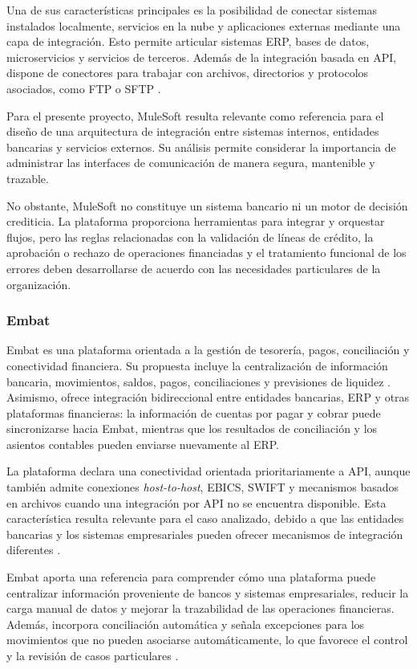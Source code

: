 Una de sus características principales es la posibilidad de conectar sistemas instalados localmente, servicios en la nube y aplicaciones externas mediante una capa de integración. Esto permite articular sistemas ERP, bases de datos, microservicios y servicios de terceros. Además de la integración basada en API, dispone de conectores para trabajar con archivos, directorios y protocolos asociados, como FTP o SFTP \citep{mulesoft}.

Para el presente proyecto, MuleSoft resulta relevante como referencia para el diseño de una arquitectura de integración entre sistemas internos, entidades bancarias y servicios externos. Su análisis permite considerar la importancia de administrar las interfaces de comunicación de manera segura, mantenible y trazable.

No obstante, MuleSoft no constituye un sistema bancario ni un motor de decisión crediticia. La plataforma proporciona herramientas para integrar y orquestar flujos, pero las reglas relacionadas con la validación de líneas de crédito, la aprobación o rechazo de operaciones financiadas y el tratamiento funcional de los errores deben desarrollarse de acuerdo con las necesidades particulares de la organización.

\subsubsection{Embat}

Embat es una plataforma orientada a la gestión de tesorería, pagos, conciliación y conectividad financiera. Su propuesta incluye la centralización de información bancaria, movimientos, saldos, pagos, conciliaciones y previsiones de liquidez \citep{embat}. Asimismo, ofrece integración bidireccional entre entidades bancarias, ERP y otras plataformas financieras: la información de cuentas por pagar y cobrar puede sincronizarse hacia Embat, mientras que los resultados de conciliación y los asientos contables pueden enviarse nuevamente al ERP.

La plataforma declara una conectividad orientada prioritariamente a API, aunque también admite conexiones \emph{host-to-host}, EBICS, SWIFT y mecanismos basados en archivos cuando una integración por API no se encuentra disponible. Esta característica resulta relevante para el caso analizado, debido a que las entidades bancarias y los sistemas empresariales pueden ofrecer mecanismos de integración diferentes \citep{embat}.

Embat aporta una referencia para comprender cómo una plataforma puede centralizar información proveniente de bancos y sistemas empresariales, reducir la carga manual de datos y mejorar la trazabilidad de las operaciones financieras. Además, incorpora conciliación automática y señala excepciones para los movimientos que no pueden asociarse automáticamente, lo que favorece el control y la revisión de casos particulares \citep{embat}.

